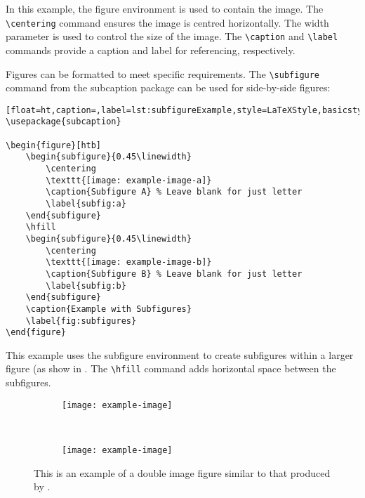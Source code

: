 		In this example, the figure environment is used to contain the image. 
		The \lstinline|\centering| command ensures the image is centred horizontally. 
		The width parameter is used to control the size of the image. 
		The \lstinline|\caption| and \lstinline|\label| commands provide a caption and label for referencing, respectively.

		Figures can be formatted to meet specific requirements. 
		The \lstinline|\subfigure| command from the subcaption package can be used for side-by-side figures:

		\begin{lstlisting}[float=ht,caption=,label=lst:subfigureExample,style=LaTeXStyle,basicstyle=\small\ttfamily,]
\usepackage{subcaption}

\begin{figure}[htb]
	\begin{subfigure}{0.45\linewidth}
		\centering
		\texttt{[image: example-image-a]}
		\caption{Subfigure A} % Leave blank for just letter
		\label{subfig:a}
	\end{subfigure}
	\hfill
	\begin{subfigure}{0.45\linewidth}
		\centering
		\texttt{[image: example-image-b]}
		\caption{Subfigure B} % Leave blank for just letter
		\label{subfig:b}
	\end{subfigure}
	\caption{Example with Subfigures}
	\label{fig:subfigures}
\end{figure}
		\end{lstlisting}

		This example uses the subfigure environment to create subfigures within a larger figure (as show in . 
		The \lstinline|\hfill| command adds horizontal space between the subfigures.

		\begin{figure}[H]
			\centering
			\begin{subfigure}{0.45\textwidth}
				\texttt{[image: example-image]}
				\caption{} %
				\label{fig:doubleImage:a}
			\end{subfigure}
			~
			\begin{subfigure}{0.45\textwidth}
				\texttt{[image: example-image]}
				\caption{} %
				\label{fig:doubleImage:b}
			\end{subfigure}
			\caption{This is an example of a double image figure similar to that produced by .}
			\label{fig:doubleImage}
		\end{figure}

